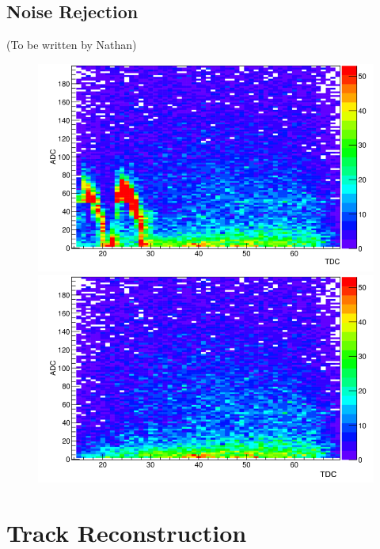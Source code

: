 \documentclass[twocolumn,showpacs,superscriptaddress,groupedaddress]{revtex4}
\begin{document}
\subsection{Noise Rejection}

(To be written by Nathan) 

\begin{figure}[tb]\centering
\includegraphics[scale=0.27]{fig/noisy_pad_before_rejection2.png}
\includegraphics[scale=0.27]{fig/noisy_pad_after_rejection2.png}
\caption{}
\label{fig:noisy_pad_before_rejection}
\end{figure}


\section{Track Reconstruction}\label{sec_perf}
\end{document}
